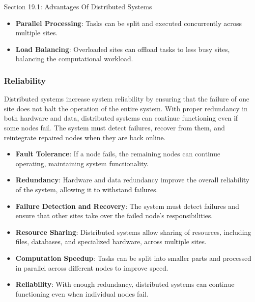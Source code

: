 \begin{notes}{Section 19.1: Advantages Of Distributed Systems}
    \begin{highlight}
    
        \begin{itemize}
            \item \textbf{Parallel Processing}: Tasks can be split and executed concurrently across multiple sites.
            \item \textbf{Load Balancing}: Overloaded sites can offload tasks to less busy sites, balancing the computational workload.
        \end{itemize}
    
    \end{highlight}
    
    \subsubsection*{Reliability}
    
    Distributed systems increase system reliability by ensuring that the failure of one site does not halt the operation of the entire system. With proper redundancy in both hardware and data, 
    distributed systems can continue functioning even if some nodes fail. The system must detect failures, recover from them, and reintegrate repaired nodes when they are back online.
    
    \begin{highlight}[Reliability]
    
        \begin{itemize}
            \item \textbf{Fault Tolerance}: If a node fails, the remaining nodes can continue operating, maintaining system functionality.
            \item \textbf{Redundancy}: Hardware and data redundancy improve the overall reliability of the system, allowing it to withstand failures.
            \item \textbf{Failure Detection and Recovery}: The system must detect failures and ensure that other sites take over the failed node's responsibilities.
        \end{itemize}
    
    \end{highlight}
    
    \begin{highlight}
    
        \begin{itemize}
            \item \textbf{Resource Sharing}: Distributed systems allow sharing of resources, including files, databases, and specialized hardware, across multiple sites.
            \item \textbf{Computation Speedup}: Tasks can be split into smaller parts and processed in parallel across different nodes to improve speed.
            \item \textbf{Reliability}: With enough redundancy, distributed systems can continue functioning even when individual nodes fail.
        \end{itemize}
    

\end{highlight}
\end{notes}
